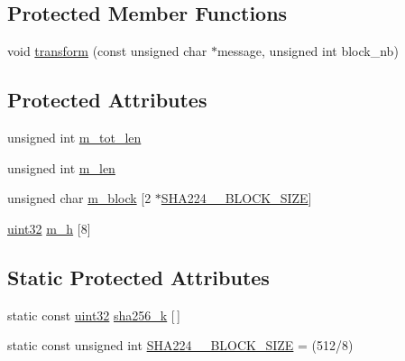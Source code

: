 \subsection*{Protected Member Functions}
\begin{DoxyCompactItemize}
\item 
void \hyperlink{classclang_1_1tidy_1_1pagesjaunes_1_1test_1_1_buffer_split_test_1_1_s_h_a256_a23474de2996f1447ee4c703375207738}{transform} (const unsigned char $\ast$message, unsigned int block\+\_\+nb)
\end{DoxyCompactItemize}
\subsection*{Protected Attributes}
\begin{DoxyCompactItemize}
\item 
unsigned int \hyperlink{classclang_1_1tidy_1_1pagesjaunes_1_1test_1_1_buffer_split_test_1_1_s_h_a256_a469efc459b9fb831065346d4f531e318}{m\+\_\+tot\+\_\+len}
\item 
unsigned int \hyperlink{classclang_1_1tidy_1_1pagesjaunes_1_1test_1_1_buffer_split_test_1_1_s_h_a256_a2c3c0c259fccd2d973a6ab64a65854ac}{m\+\_\+len}
\item 
unsigned char \hyperlink{classclang_1_1tidy_1_1pagesjaunes_1_1test_1_1_buffer_split_test_1_1_s_h_a256_a9d49bf47dad4234b25b2648bdbfa0327}{m\+\_\+block} \mbox{[}2 $\ast$\hyperlink{classclang_1_1tidy_1_1pagesjaunes_1_1test_1_1_buffer_split_test_1_1_s_h_a256_a23bb369e25f470fb0097565915a35552}{S\+H\+A224\+\_\+\_\+\+B\+L\+O\+C\+K\+\_\+\+S\+I\+ZE}\mbox{]}
\item 
\hyperlink{classclang_1_1tidy_1_1pagesjaunes_1_1test_1_1_buffer_split_test_1_1_s_h_a256_add2f6d098907647a38f2946b5a42269b}{uint32} \hyperlink{classclang_1_1tidy_1_1pagesjaunes_1_1test_1_1_buffer_split_test_1_1_s_h_a256_a31899ad7dfcd86d50b4a1801ba167a55}{m\+\_\+h} \mbox{[}8\mbox{]}
\end{DoxyCompactItemize}
\subsection*{Static Protected Attributes}
\begin{DoxyCompactItemize}
\item 
static const \hyperlink{classclang_1_1tidy_1_1pagesjaunes_1_1test_1_1_buffer_split_test_1_1_s_h_a256_add2f6d098907647a38f2946b5a42269b}{uint32} \hyperlink{classclang_1_1tidy_1_1pagesjaunes_1_1test_1_1_buffer_split_test_1_1_s_h_a256_ace0912ea927b10a7e1ea91c0740115d9}{sha256\+\_\+k} \mbox{[}$\,$\mbox{]}
\item 
static const unsigned int \hyperlink{classclang_1_1tidy_1_1pagesjaunes_1_1test_1_1_buffer_split_test_1_1_s_h_a256_a23bb369e25f470fb0097565915a35552}{S\+H\+A224\+\_\+\_\+\+B\+L\+O\+C\+K\+\_\+\+S\+I\+ZE} = (512/8)
\end{DoxyCompactItemize}


